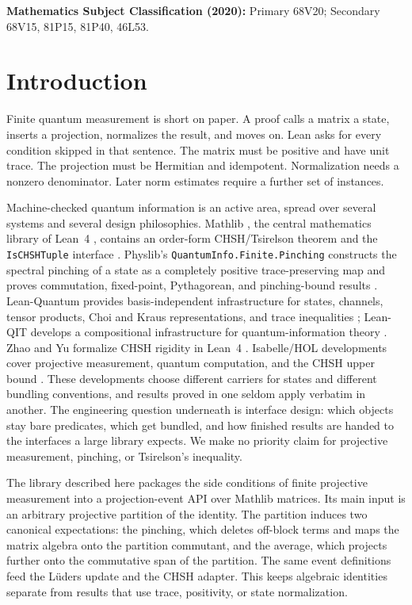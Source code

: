 \documentclass[11pt]{article}
\renewcommand{\_}{\textunderscore\allowbreak}
\theoremstyle{remark}
\begin{document}
\medskip
\noindent\textbf{Mathematics Subject Classification (2020):}
Primary 68V20; Secondary 68V15, 81P15, 81P40, 46L53.

\section{Introduction}
\label{sec:intro}

Finite quantum measurement is short on paper. A proof calls a matrix a state,
inserts a projection, normalizes the result, and moves on. Lean asks for every
condition skipped in that sentence. The matrix must be positive and have unit
trace. The projection must be Hermitian and idempotent. Normalization needs a
nonzero denominator. Later norm estimates require a further set of
instances.

Machine-checked quantum information is an active area, spread over several
systems and several design philosophies. Mathlib \cite{mathlib2020}, the
central mathematics library of Lean~4 \cite{lean4}, contains an order-form
CHSH/Tsirelson theorem and the \texttt{IsCHSHTuple} interface
\cite{mathlibCHSH2026}. Physlib's \texttt{QuantumInfo.Finite.Pinching}
constructs the spectral pinching of a state as a completely positive
trace-preserving map and proves commutation, fixed-point, Pythagorean, and
pinching-bound results \cite{physlib,physlibPinching2026}. Lean-Quantum
provides basis-independent infrastructure for states, channels, tensor
products, Choi and Kraus representations, and trace inequalities
\cite{kasauraEtAl2026LeanQuantum}; Lean-QIT develops a compositional
infrastructure for quantum-information theory \cite{zhuEtAl2026LeanQIT}. Zhao
and Yu formalize CHSH rigidity in Lean~4 \cite{zhaoYu2026CHSHRigidity}.
Isabelle/HOL developments cover projective measurement, quantum computation,
and the CHSH upper bound
\cite{echenim2021afp,echenimmhalla2023afp,echenimmhalla2024,bordg2021}.
These developments choose different carriers for states and different
bundling conventions, and results proved in one seldom apply verbatim in
another. The engineering question underneath is interface design: which
objects stay bare predicates, which get bundled, and how finished results are
handed to the interfaces a large library expects. We make no priority claim
for projective measurement, pinching, or Tsirelson's inequality.

The library described here packages the side conditions of finite projective
measurement into a projection-event API over Mathlib matrices. Its main input
is an arbitrary projective partition of the identity. The partition induces
two canonical expectations: the pinching, which deletes off-block terms and
maps the matrix algebra onto the partition commutant, and the average, which
projects further onto the commutative span of the partition. The same event
definitions feed the L\"uders update and the CHSH adapter. This keeps
algebraic identities separate from results that use trace, positivity, or
state normalization.
\end{document}
